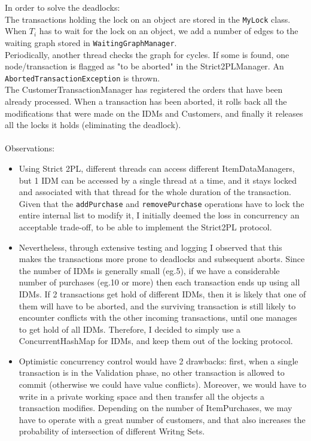 \documentclass[paper=a4, fontsize=11pt]{scrartcl} %
\numberwithin{equation}{section} %
\numberwithin{figure}{section} %
\numberwithin{table}{section} %
\begin{document}
In order to solve the deadlocks: \\
The transactions holding the lock on an object are stored in the \verb|MyLock| class.\\
When $T_i$ has to wait for the lock on an object, we add a number of edges to the waiting graph stored in \verb|WaitingGraphManager|.\\
Periodically, another thread checks the graph for cycles. If some is found, one node/transaction is flagged as "to be aborted" in the Strict2PLManager. An \verb|AbortedTransactionException| is thrown.\\
The CustomerTransactionManager has registered the orders that have been already processed. When a transaction has been aborted, it rolls back all the modifications that were made on the IDMs and Customers, and finally it releases all the locks it holds (eliminating the deadlock).\\
~\\
Observations:
\begin{itemize}
\item Using Strict 2PL, different threads can access different ItemDataManagers, but 1 IDM can be accessed by a single thread at a time, and it stays locked and associated with that thread for the whole duration of the transaction. Given that the \verb|addPurchase| and \verb|removePurchase| operations have to lock the entire internal list to modify it, I initially deemed the loss in concurrency an acceptable trade-off, to be able to implement the Strict2PL protocol.
\item Nevertheless, through extensive testing and logging I observed that this makes the transactions more prone to deadlocks and subsequent aborts. Since the number of IDMs is generally small (eg.5), if we have a considerable number of purchases (eg.10 or more) then each transaction ends up using all IDMs. If 2 transactions get hold of different IDMs, then it is likely that one of them will have to be aborted, and the surviving transaction is still likely to encounter conflicts with the other incoming transactions, until one manages to get hold of all IDMs. Therefore, I decided to simply use a ConcurrentHashMap for IDMs, and keep them out of the locking protocol.
\item Optimistic concurrency control would have 2 drawbacks: first, when a single transaction is in the Validation phase, no other transaction is allowed to commit (otherwise we could have value conflicts). Moreover, we would have to write in a private working space and then transfer all the objects a transaction modifies. Depending on the number of ItemPurchases, we may have to operate with a great number of customers, and that also increases the probability of intersection of different Writng Sets.
\end{itemize}
\end{document}
